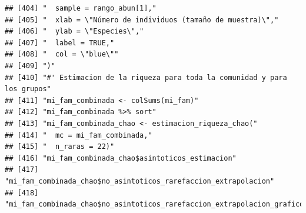 \documentclass[11pt,]{article}
\begin{document}
\begin{verbatim}
## [404] "  sample = rango_abun[1],"                                                                                                                                             
## [405] "  xlab = \"Número de individuos (tamaño de muestra)\","                                                                                                                
## [406] "  ylab = \"Especies\","                                                                                                                                                
## [407] "  label = TRUE,"                                                                                                                                                       
## [408] "  col = \"blue\""                                                                                                                                                      
## [409] ")"                                                                                                                                                                     
## [410] "#' Estimacion de la riqueza para toda la comunidad y para los grupos"                                                                                                  
## [411] "mi_fam_combinada <- colSums(mi_fam)"                                                                                                                                   
## [412] "mi_fam_combinada %>% sort"                                                                                                                                             
## [413] "mi_fam_combinada_chao <- estimacion_riqueza_chao("                                                                                                                     
## [414] "  mc = mi_fam_combinada,"                                                                                                                                              
## [415] "  n_raras = 22)"                                                                                                                                                       
## [416] "mi_fam_combinada_chao$asintoticos_estimacion"                                                                                                                          
## [417] "mi_fam_combinada_chao$no_asintoticos_rarefaccion_extrapolacion"                                                                                                        
## [418] "mi_fam_combinada_chao$no_asintoticos_rarefaccion_extrapolacion_grafico"                                                                                                

\end{verbatim}
\end{document}
